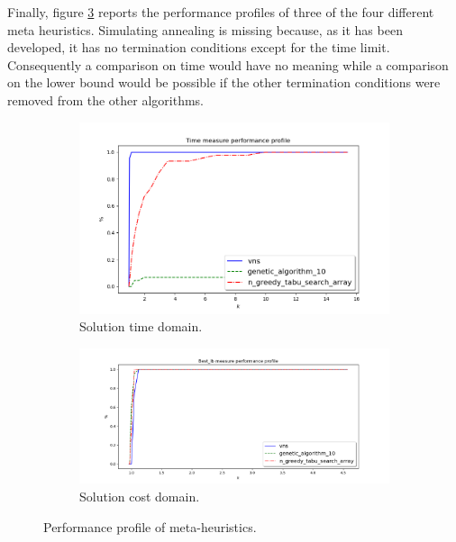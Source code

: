 Finally, figure \ref{fig:meta_heur} reports the performance profiles of three of the four different meta heuristics. Simulating annealing is missing because, as it has been developed, it has no termination conditions except for the time limit. Consequently a comparison on time would have no meaning while a comparison on the lower bound would be possible if the other termination conditions were removed from the other algorithms.\\

\begin{figure}[!h]
	\centering
	\begin{subfigure}{\columnwidth}
		\centering
		\includegraphics[width=\columnwidth]{../res/metaheur_time_L_2ga_new.png}
		\caption{Solution time domain.}
		\label{fig:meta_heur_time}
	\end{subfigure}
	\begin{subfigure}{\columnwidth}
		\centering
		\includegraphics[width=\columnwidth]{../res/metaheur_lb_L_2ga_new.png}
		\caption{Solution cost domain.}
		\label{fig:meta_heur_lb}
	\end{subfigure}
	\caption{Performance profile of meta-heuristics.}
	\label{fig:meta_heur}
\end{figure}

